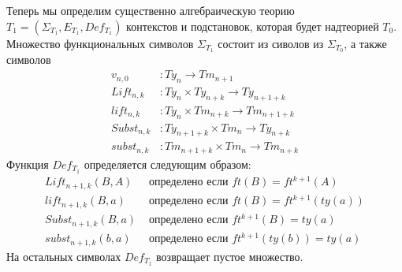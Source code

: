 \documentclass{amsart}
\theoremstyle{definition}
\theoremstyle{remark}
\numberwithin{figure}{section}
\begin{document}
Теперь мы определим существенно алгебраическую теорию $T_1 = (\Sigma_{T_1}, E_{T_1}, Def_{T_1})$ контекстов и подстановок, которая будет надтеорией $T_0$.
Множество функциональных символов $\Sigma_{T_1}$ состоит из сиволов из $\Sigma_{T_0}$, а также символов
\begin{align*}
v_{n,0}     & : Ty_n \to Tm_{n+1} \\
Lift_{n,k}  & : Ty_n \times Ty_{n+k} \to Ty_{n+1+k} \\
lift_{n,k}  & : Ty_n \times Tm_{n+k} \to Tm_{n+1+k} \\
Subst_{n,k} & : Ty_{n+1+k} \times Tm_n \to Ty_{n+k} \\
subst_{n,k} & : Tm_{n+1+k} \times Tm_n \to Tm_{n+k}
\end{align*}
Функция $Def_{T_1}$ определяется следующим образом:
\begin{align*}
Lift_{n+1,k}(B, A)  & \text{ определено если } ft(B) = ft^{k+1}(A) \\
lift_{n+1,k}(B, a)  & \text{ определено если } ft(B) = ft^{k+1}(ty(a)) \\
Subst_{n+1,k}(B, a) & \text{ определено если } ft^{k+1}(B) = ty(a) \\
subst_{n+1,k}(b, a) & \text{ определено если } ft^{k+1}(ty(b)) = ty(a)
\end{align*}
На остальных символах $Def_{T_1}$ возвращает пустое множество.

\begin{comment}
Мы определяем производные термы $v_{n,i} : Ty_n \to Tm_{n+1}$ для любого $1 \leq i \leq n$, $Lift^i_{n,k} : Ty_{n+i-1} \times Ty_{n+k} \to Ty_{n+i+k}$ и $lift^i : Ty_{n+i-1} \times Tm_{n+k} \to Tm_{n+i+k}$ следующим образом:
\begin{align*}
v_{n+1,i+1}(A)         & := lift_{n+1,0}(A, v_{n,i}(ft_n(A))) \\
Lift^1_{n,k}(B, A)     & := Lift_{n,k}(B, A) \\
Lift^{i+1}_{n,k}(B, A) & := Lift_{n+i,k}(B, Lift^i_{n,k}(ft(B), A)) \\
lift^1_{n,k}(B, a)     & := lift_{n,k}(B, a) \\
lift^{i+1}_{n,k}(B, a) & := lift_{n+i,k}(B, lift^i_{n,k}(ft(B), a))
\end{align*}
Мы будем, как правило, опускать $n$ в нотации $v_{n,i}$, $Lift^i_{n,k}$ и $lift^i_{n,k}$ и писать просто $v_i$, $Lift^i_k$ и $lift^i_k$.
\end{comment}
\end{document}
